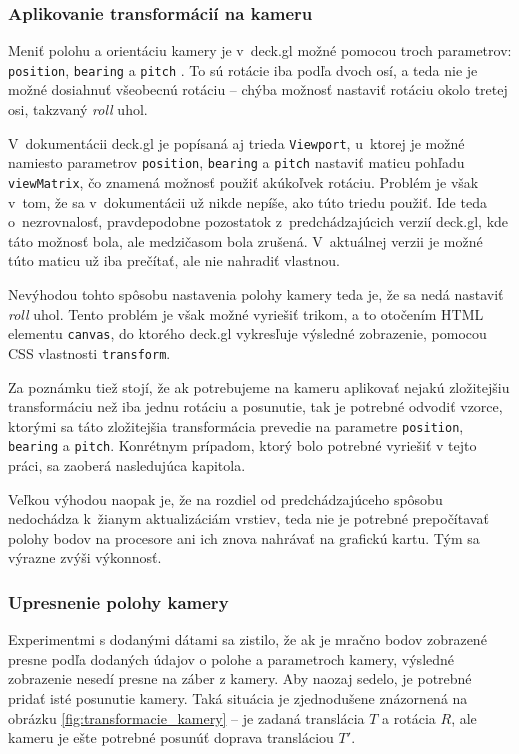 \subsubsection{Aplikovanie transformácií na kameru}

Meniť polohu a orientáciu kamery je v~deck.gl možné pomocou troch parametrov: \texttt{position}, \texttt{bearing} a \texttt{pitch} \cite{deck.gl_documentation}. To sú rotácie iba podľa dvoch osí, a teda nie je možné dosiahnuť všeobecnú rotáciu -- chýba možnosť nastaviť rotáciu okolo tretej osi, takzvaný \emph{roll} uhol.

V~dokumentácii deck.gl je popísaná aj trieda \texttt{Viewport}, u~ktorej je možné namiesto parametrov \texttt{position}, \texttt{bearing} a \texttt{pitch} nastaviť maticu pohľadu \texttt{viewMatrix}, čo znamená možnosť použiť akúkoľvek rotáciu. Problém je však v~tom, že sa v~dokumentácii už nikde nepíše, ako túto triedu použiť. Ide teda o~nezrovnalosť, pravdepodobne pozostatok z~predchádzajúcich verzií deck.gl, kde táto možnosť bola, ale medzičasom bola zrušená. V~aktuálnej verzii je možné túto maticu už iba prečítať, ale nie nahradiť vlastnou.

Nevýhodou tohto spôsobu nastavenia polohy kamery teda je, že sa nedá nastaviť \emph{roll} uhol. Tento problém je však možné vyriešiť trikom, a to otočením HTML elementu \texttt{canvas}, do ktorého deck.gl vykresľuje výsledné zobrazenie, pomocou CSS vlastnosti \texttt{transform}. 

Za poznámku tiež stojí, že ak potrebujeme na kameru aplikovať nejakú zložitejšiu transformáciu než iba jednu rotáciu a posunutie, tak je potrebné odvodiť vzorce, ktorými sa táto zložitejšia transformácia prevedie na parametre \texttt{position}, \texttt{bearing} a \texttt{pitch}. Konrétnym prípadom, ktorý bolo potrebné vyriešiť v tejto práci, sa zaoberá nasledujúca kapitola.

Veľkou výhodou naopak je, že na rozdiel od predchádzajúceho spôsobu nedochádza k~žianym aktualizáciám vrstiev, teda nie je potrebné prepočítavať polohy bodov na procesore ani ich znova nahrávať na grafickú kartu. Tým sa výrazne zvýši výkonnosť.

\subsubsection{Upresnenie polohy kamery}

Experimentmi s dodanými dátami sa zistilo, že ak je mračno bodov zobrazené presne podľa dodaných údajov o polohe a parametroch kamery, výsledné zobrazenie nesedí presne na záber z kamery. Aby naozaj sedelo, je potrebné pridať isté posunutie kamery. Taká situácia je zjednodušene znázornená na obrázku \ref{fig:transformacie_kamery} -- je zadaná translácia $T$ a rotácia $R$, ale kameru je ešte potrebné posunúť doprava transláciou $T'$.

